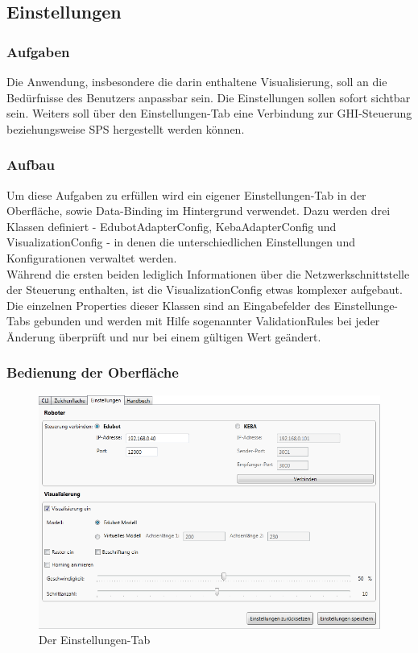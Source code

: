 \subsection{Einstellungen}

\subsubsection{Aufgaben}
Die Anwendung, insbesondere die darin enthaltene Visualisierung, soll an die Bedürfnisse des Benutzers anpassbar sein. Die Einstellungen sollen sofort sichtbar sein. Weiters soll über den Einstellungen-Tab eine Verbindung zur GHI-Steuerung beziehungsweise SPS hergestellt werden können.

\subsubsection{Aufbau}
Um diese Aufgaben zu erfüllen wird ein eigener Einstellungen-Tab in der Oberfläche, sowie Data-Binding im Hintergrund verwendet. Dazu werden drei Klassen definiert - EdubotAdapterConfig, KebaAdapterConfig und VisualizationConfig - in denen die unterschiedlichen Einstellungen und Konfigurationen verwaltet werden. \\
Während die ersten beiden lediglich Informationen über die Netzwerkschnittstelle der Steuerung enthalten, ist die VisualizationConfig etwas komplexer aufgebaut. Die einzelnen Properties dieser Klassen sind an Eingabefelder des Einstellunge-Tabs gebunden und werden mit Hilfe sogenannter ValidationRules bei jeder Änderung überprüft und nur bei einem gültigen Wert geändert.

\subsubsection{Bedienung der Oberfläche}

\begin{figure}[H]
  \centering
  \begin{minipage}[t]{12 cm}
  	\centering
  	\includegraphics[width=12cm]{images/Settings} 
    \caption{Der Einstellungen-Tab}
  \end{minipage}
\end{figure}

